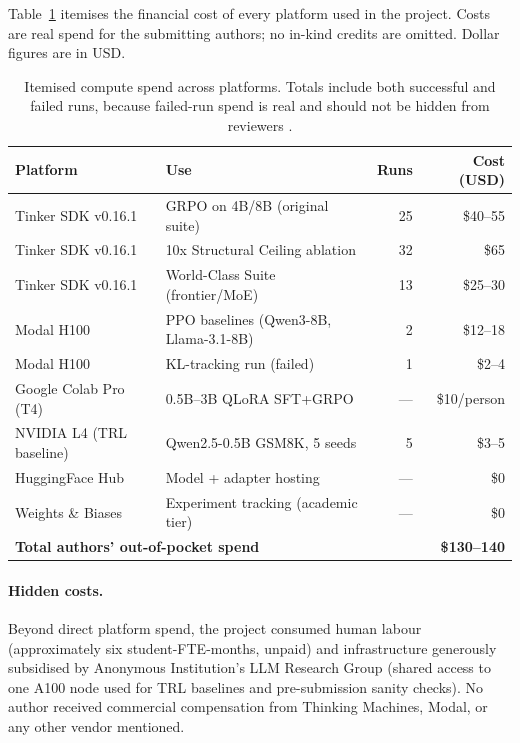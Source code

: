 Table~\ref{tab:compute_spend} itemises the financial cost of every
platform used in the project. Costs are real spend for the submitting
authors; no in-kind credits are omitted. Dollar figures are in USD.

\begin{table}[ht]
\centering
\small
\caption{Itemised compute spend across platforms. Totals include both
successful and failed runs, because failed-run spend is real and should
not be hidden from reviewers \cite{henderson2018deep}.}
\label{tab:compute_spend}
\begin{tabular}{llrr}
\toprule
\textbf{Platform} & \textbf{Use} & \textbf{Runs} & \textbf{Cost (USD)} \\
\midrule
Tinker SDK v0.16.1 & GRPO on 4B/8B (original suite)        & 25 & \$40--55 \\
Tinker SDK v0.16.1 & 10x Structural Ceiling ablation       & 32 & \$65 \\
Tinker SDK v0.16.1 & World-Class Suite (frontier/MoE)      & 13 & \$25--30 \\
Modal H100         & PPO baselines (Qwen3-8B, Llama-3.1-8B)& 2  & \$12--18 \\
Modal H100         & KL-tracking run (failed)              & 1  & \$2--4   \\
Google Colab Pro (T4) & 0.5B--3B QLoRA SFT+GRPO            & --- & \$10/person \\
NVIDIA L4 (TRL baseline)& Qwen2.5-0.5B GSM8K, 5 seeds      & 5  & \$3--5   \\
HuggingFace Hub    & Model + adapter hosting               & --- & \$0 \\
Weights \& Biases  & Experiment tracking (academic tier)   & --- & \$0 \\
\midrule
\multicolumn{3}{l}{\textbf{Total authors' out-of-pocket spend}} & \textbf{\$130--140} \\
\bottomrule
\end{tabular}
\end{table}

\paragraph{Hidden costs.} Beyond direct platform spend, the project
consumed human labour (approximately six student-FTE-months, unpaid) and
infrastructure generously subsidised by Anonymous Institution's LLM Research
Group (shared access to one A100 node used for TRL baselines and
pre-submission sanity checks). No author received commercial compensation
from Thinking Machines, Modal, or any other vendor mentioned.

